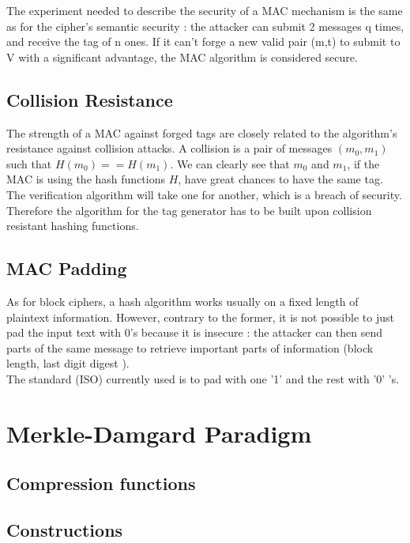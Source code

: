 The experiment needed to describe the security of a MAC mechanism is the same as for the cipher's semantic security : the attacker can submit 2 messages q times, and receive the tag of n ones. If it can't forge a new valid pair (m,t) to submit to V with a significant advantage, the MAC algorithm is considered secure.

\subsection{Collision Resistance}

The strength of a MAC against forged tags are closely related to the algorithm's resistance against collision attacks. A collision is a pair of messages $(m_0,m_1)$ such that $H(m_0) == H(m_1)$. We can clearly see that $m_0$ and $m_1$, if the MAC is using the hash functions $H$, have great chances to have the same tag. The verification algorithm will take one for another, which is a breach of security. \\
Therefore the algorithm for the tag generator has to be built upon collision resistant hashing functions.


\subsection{MAC Padding}

As for block ciphers, a hash algorithm works usually on a fixed length of plaintext information. However, contrary to the former, it is not possible to just pad the input text with 0's because it is insecure : the attacker can then send parts of the same message to retrieve important parts of information (block length, last digit digest ). \\
The standard (ISO) currently used is to pad with one '1' and the rest with '0' 's.


\section{Merkle-Damgard Paradigm}

\subsection{Compression functions}



\subsection{Constructions}

